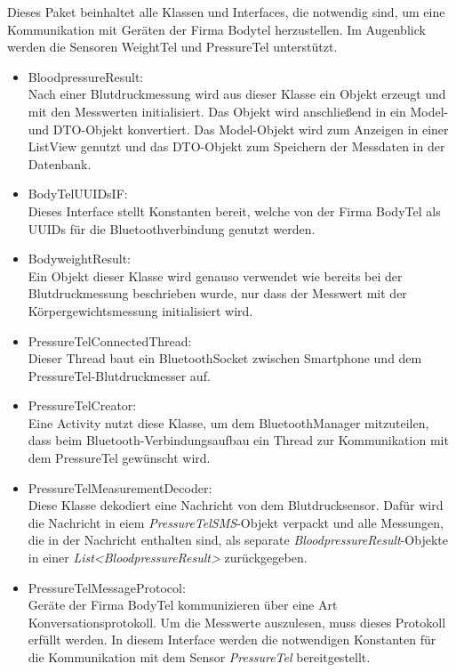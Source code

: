 Dieses Paket beinhaltet alle Klassen und Interfaces, die notwendig sind, um eine Kommunikation mit Ger\"aten
der Firma Bodytel herzustellen.
Im Augenblick werden die Sensoren WeightTel und PressureTel unterst\"utzt.

\begin{itemize}
 \item BloodpressureResult:\\
 Nach einer Blutdruckmessung wird aus dieser Klasse ein Objekt erzeugt und mit den Messwerten initialisiert.
 Das Objekt wird anschlie\ss{}end in ein Model- und DTO-Objekt konvertiert.
 Das Model-Objekt wird zum Anzeigen in einer ListView genutzt und das DTO-Objekt zum Speichern der Messdaten in der Datenbank.
 
 \item BodyTelUUIDsIF:\\
 Dieses Interface stellt Konstanten bereit, welche von der Firma BodyTel als UUIDs f\"ur die Bluetoothverbindung genutzt werden.
 
 \item BodyweightResult:\\
 Ein Objekt dieser Klasse wird genauso verwendet wie bereits bei der Blutdruckmessung beschrieben wurde, 
 nur dass der Messwert mit der K\"orpergewichtsmessung initialisiert wird.
 
 \item PressureTelConnectedThread:\\
 Dieser Thread baut ein BluetoothSocket zwischen Smartphone und dem PressureTel-Blutdruckmesser auf.
 
 \item PressureTelCreator:\\
 Eine Activity nutzt diese Klasse, um dem BluetoothManager mitzuteilen,
 dass beim Bluetooth-Verbindungsaufbau ein Thread zur Kommunikation mit dem PressureTel gew\"unscht wird.
 
 \item PressureTelMeasurementDecoder:\\
 Diese Klasse dekodiert eine Nachricht von dem Blutdrucksensor.
 Daf\"ur wird die Nachricht in eiem \emph{PressureTelSMS}-Objekt verpackt und alle Messungen,
 die in der Nachricht enthalten sind, als separate \emph{BloodpressureResult}-Objekte
 in einer \emph{List<BloodpressureResult>} zur\"uckgegeben.
 
 \item PressureTelMessageProtocol:\\
 Ger\"ate der Firma BodyTel kommunizieren \"uber eine Art Konversationsprotokoll.
 Um die Messwerte auszulesen, muss dieses Protokoll erf\"ullt werden.
 In diesem Interface werden die notwendigen Konstanten f\"ur die Kommunikation mit dem Sensor \emph{PressureTel} bereitgestellt.
 

\end{itemize}
